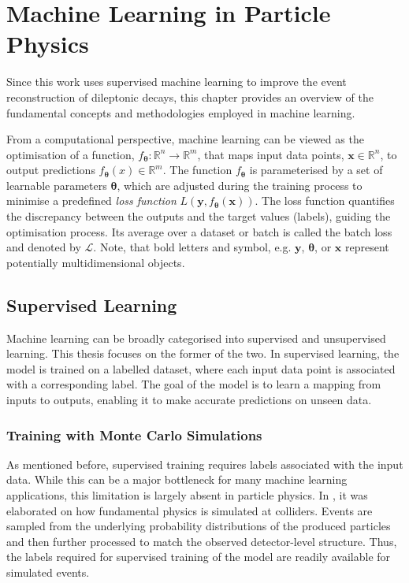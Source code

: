 \chapter{Machine Learning in Particle Physics}
\label{chap:machine-learning}
Since this work uses supervised machine learning to improve the event reconstruction of dileptonic \ttbar decays, this chapter provides an overview of the fundamental concepts and methodologies employed in machine learning.

From a computational perspective, machine learning can be viewed as the optimisation of a function, $f_{\boldsymbol{\theta}}:\mathbb{R}^n \rightarrow \mathbb{R}^m$, that maps input data points, $\mathbf{x} \in \mathbb{R}^n$, to output predictions $f_{\boldsymbol{\theta}}(x) \in \mathbb{R}^m$.
The function $f_{\boldsymbol{\theta}}$ is parameterised by a set of learnable parameters ${\boldsymbol{\theta}}$, which are adjusted during the training process to minimise a predefined \textit{loss function} $L(\mathbf{y}, f_{\boldsymbol{\theta}}(\mathbf{x}))$. The loss function quantifies the discrepancy between the outputs and the target values (labels), guiding the optimisation process. Its average over a dataset or batch is called the batch loss and denoted by $\mathcal{L}$.
Note, that bold letters and symbol, e.g. $\mathbf{y}$, $\boldsymbol{\theta}$, or $\mathbf{x}$ represent potentially multidimensional objects.


\section{Supervised Learning}
Machine learning can be broadly categorised into supervised and unsupervised learning. This thesis focuses on the former of the two. In supervised learning, the model is trained on a labelled dataset, where each input data point is associated with a corresponding label. The goal of the model is to learn a mapping from inputs to outputs, enabling it to make accurate predictions on unseen data.

\subsection{Training with Monte Carlo Simulations}
As mentioned before, supervised training requires labels associated with the input data. While this can be a major bottleneck for many machine learning applications, this limitation is largely absent in particle physics. In , it was elaborated on how fundamental physics is simulated at colliders. Events are sampled from the underlying probability distributions of the produced particles and then further processed to match the observed detector-level structure. Thus, the labels required for supervised training of the model are readily available for simulated events.

